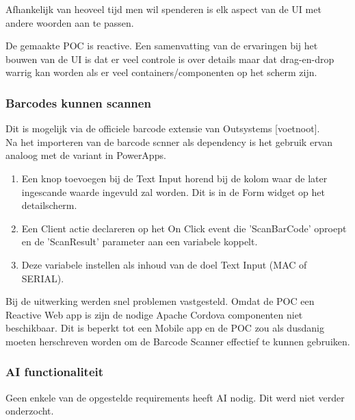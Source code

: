 Afhankelijk van heoveel tijd men wil spenderen is elk aspect van de UI met andere woorden aan te passen.

De gemaakte POC is reactive. Een samenvatting van de ervaringen bij het bouwen van de UI is dat er veel controle is over details maar dat drag-en-drop warrig kan worden als er veel containers/componenten op het scherm zijn.

\subsubsection{Barcodes kunnen scannen}

Dit is mogelijk via de officiele barcode extensie van Outsystems [voetnoot].\\
Na het importeren van de barcode scnner als dependency is het gebruik ervan analoog met de variant in PowerApps.
\begin{enumerate}
    \item Een knop toevoegen bij de Text Input horend bij de kolom waar de later ingescande waarde ingevuld zal worden. Dit is in de Form widget op het detailscherm.
    \item Een Client actie declareren op het On Click event die 'ScanBarCode' oproept en de 'ScanResult' parameter aan een variabele koppelt.
    \item Deze variabele instellen als inhoud van de doel Text Input (MAC of SERIAL).
\end{enumerate}

Bij de uitwerking werden snel problemen vastgesteld. Omdat de POC een Reactive Web app is zijn de nodige Apache Cordova componenten niet beschikbaar. Dit is beperkt tot een Mobile app en de POC zou als dusdanig moeten herschreven worden om de Barcode Scanner effectief te kunnen gebruiken.

\subsubsection{AI functionaliteit}

Geen enkele van de opgestelde requirements heeft AI nodig. Dit werd niet verder onderzocht.

